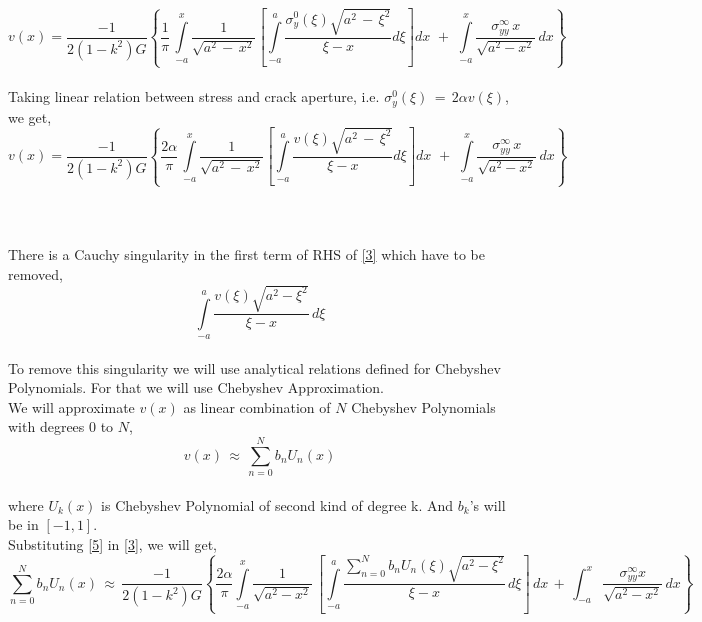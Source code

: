 \documentclass[authoryear,12pt]{elsarticle}
\begin{document}
		\begin{equation*}
			v(x) = \frac{-1}{2(1-k^2)G}\left \{\frac{1}{\pi}\,\int\limits_{-a}^x \frac{1}{\sqrt{a^2\,-\,x^2}}\left[\int\limits_{-a}^a \frac{\sigma_y^0(\xi)\sqrt{a^2\,-\,\xi^2}}{\xi-x}d\xi\right]dx \,\,+\,\, \int\limits_{-a}^x \frac{\sigma^{\infty}_{yy}\,x}{\sqrt{a^2-x^2}}\,dx\right\}
		\end{equation*}
		\\
		Taking linear relation between stress and crack aperture, i.e. \(\sigma_y^0(\xi)\,=\,2\alpha v(\xi)\), we get,
		\begin{equation}\label{3}
			v(x) = \frac{-1}{2(1-k^2)G}\left \{\frac{2\alpha}{\pi}\,\int\limits_{-a}^x \frac{1}{\sqrt{a^2\,-\,x^2}}\left[\int\limits_{-a}^a \frac{v(\xi)\sqrt{a^2\,-\,\xi^2}}{\xi-x}d\xi\right]dx \,\,+\,\, \int\limits_{-a}^x \frac{\sigma^{\infty}_{yy}\,x}{\sqrt{a^2-x^2}}\,dx\right\}
		\end{equation}\\
		\\
		\\
		There is a Cauchy singularity in the first term of RHS of \cref{3} which have to be removed,
		\begin{equation}\label{4}
			\int\limits_{-a}^a \frac{v(\xi)\sqrt{a^2 - \xi ^2}}{\xi - x}\,d\xi
		\end{equation}
		\\
		To remove this singularity we will use analytical relations defined for Chebyshev Polynomials. For that we will use Chebyshev Approximation. \\ We will approximate \(v(x)\) as linear combination of \(N\) Chebyshev Polynomials with degrees \(0\) to \( N \),
		\begin{equation}\label{5}
			v(x)\,\approx\,\sum\limits_{n=0}^{N} b_n U_n(x)
		\end{equation}
		\\
		where \(U_k(x)\) is Chebyshev Polynomial of second kind of degree k. And \(b_k\)'s will be in \([-1,1]\).
		\\
		Substituting \cref{5} in \cref{3}, we will get,
		\begin{equation*}
			\sum_{n=0}^{N} b_n U_n(x)\,\approx\,\frac{-1}{2(1-k^2)G}\left\{\frac{2\alpha}{\pi}\int\limits_{-a}^x\frac{1}{\sqrt{a^2 - x^2}}\,\left[\int\limits_{-a}^a\frac{\sum\limits_{n=0}^{N} b_n U_n(\xi)\sqrt{a^2-\xi^2}}{\xi-x}\,d\xi \right]\,dx\,+\,\int_{-a}^x \frac{\sigma^{\infty}_{yy}x}{\sqrt{a^2-x^2}}\,dx\right\}
		\end{equation*}
		\\
\end{document}
